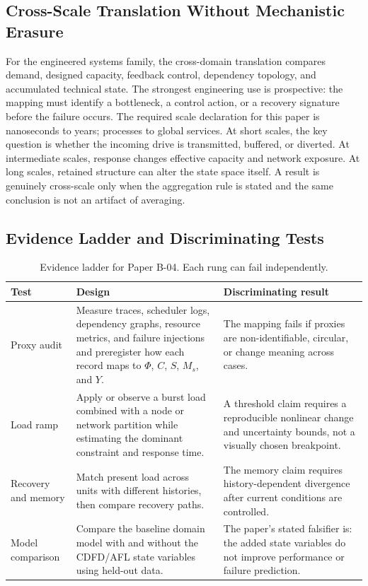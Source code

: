 \documentclass[11pt,a4paper]{article}
\begin{document}
\subsection{Cross-Scale Translation Without Mechanistic Erasure}

For the engineered systems family, the cross-domain translation compares demand, designed capacity, feedback control, dependency topology, and accumulated technical state. The strongest engineering use is prospective: the mapping must identify a bottleneck, a control action, or a recovery signature before the failure occurs. \cite{BarabasiAlbert1999,WattsStrogatz1998,Shannon1948,BakTangWiesenfeld1987}
The required scale declaration for this paper is nanoseconds to years; processes to global services. At short
scales, the key question is whether the incoming drive is transmitted,
buffered, or diverted. At intermediate scales, response changes effective
capacity and network exposure. At long scales, retained structure can alter the
state space itself. A result is genuinely cross-scale only when the aggregation
rule is stated and the same conclusion is not an artifact of averaging.

\subsection{Evidence Ladder and Discriminating Tests}

\begin{table}[htbp]
\centering
\small
\caption{Evidence ladder for Paper B-04. Each rung can fail independently.}
\begin{tabularx}{\textwidth}{|p{}|X|X|}
\hline
\textbf{Test} & \textbf{Design} & \textbf{Discriminating result} \\
\hline
Proxy audit & Measure traces, scheduler logs, dependency graphs, resource metrics, and failure injections and preregister how each record maps to $\Phi$, $C$, $S$, $M_s$, and $Y$. & The mapping fails if proxies are non-identifiable, circular, or change meaning across cases. \\
\hline
Load ramp & Apply or observe a burst load combined with a node or network partition while estimating the dominant constraint and response time. & A threshold claim requires a reproducible nonlinear change and uncertainty bounds, not a visually chosen breakpoint. \\
\hline
Recovery and memory & Match present load across units with different histories, then compare recovery paths. & The memory claim requires history-dependent divergence after current conditions are controlled. \\
\hline
Model comparison & Compare the baseline domain model with and without the CDFD/AFL state variables using held-out data. & The paper's stated falsifier is: the added state variables do not improve performance or failure prediction. \\
\hline
\end{tabularx}
\end{table}
\end{document}
